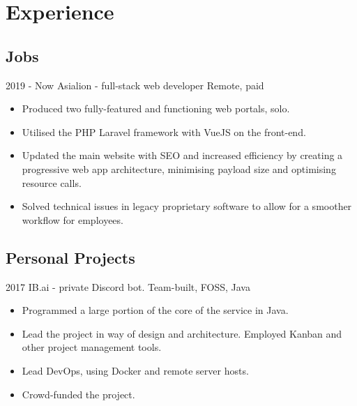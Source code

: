 \documentclass[]{jvcv}
\begin{document}
%
\vspace{0.5cm}
\section{Experience}

\subsection{Jobs}
\vspace{0.05cm}

\begin{jobslist}
	\jobentry
		{2019 - Now}
		{Asialion - full-stack web developer}
		{Remote, paid}
		{\begin{itemize}
			\item Produced two fully-featured and functioning web portals, solo.
			\item Utilised the PHP Laravel framework with VueJS on the front-end.
			\item Updated the main website with SEO and increased efficiency by creating a progressive web app architecture, minimising payload size and optimising resource calls.
			\item Solved technical issues in legacy proprietary software to allow for a smoother workflow for employees.
		\end{itemize}}
\end{jobslist}

%
\vspace{0.1cm}
\subsection{Personal Projects}
\vspace{0.05cm}

\begin{projectslist}
	\projectentry
		{2017}
		{IB.ai {\normalfont - private Discord bot.}}
		{Team-built, FOSS, Java}
		{\begin{itemize}
			\item Programmed a large portion of the core of the service in Java.
			\item Lead the project in way of design and architecture. Employed Kanban and other project management tools.
			\item Lead DevOps, using Docker and remote server hosts.
			\item Crowd-funded the project.
		\end{itemize}}
\end{projectslist}
\end{document}
